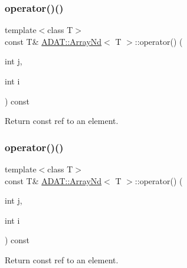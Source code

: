 \subsubsection{\texorpdfstring{operator()()}{operator()()}\hspace{0.1cm}{\footnotesize\ttfamily [11/24]}}
{\footnotesize\ttfamily template$<$class T$>$ \\
const T\& \mbox{\hyperlink{classADAT_1_1ArrayNd}{A\+D\+A\+T\+::\+Array\+Nd}}$<$ T $>$\+::operator() (\begin{DoxyParamCaption}\item[{int}]{j,  }\item[{int}]{i }\end{DoxyParamCaption}) const\hspace{0.3cm}{\ttfamily [inline]}}



Return const ref to an element. 

\mbox{\label{classADAT_1_1ArrayNd_a476aa275f16078c90cb745312f344194}} 
\subsubsection{\texorpdfstring{operator()()}{operator()()}\hspace{0.1cm}{\footnotesize\ttfamily [12/24]}}
{\footnotesize\ttfamily template$<$class T$>$ \\
const T\& \mbox{\hyperlink{classADAT_1_1ArrayNd}{A\+D\+A\+T\+::\+Array\+Nd}}$<$ T $>$\+::operator() (\begin{DoxyParamCaption}\item[{int}]{j,  }\item[{int}]{i }\end{DoxyParamCaption}) const\hspace{0.3cm}{\ttfamily [inline]}}



Return const ref to an element. 

\mbox{\label{classADAT_1_1ArrayNd_a8c15c0d70203e59f5f746350eb6262a9}} 
